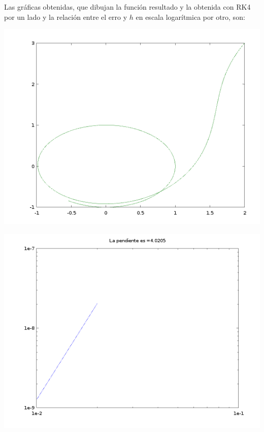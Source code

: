 Las gráficas obtenidas, que dibujan la función resultado y la obtenida con RK4 por un lado y la relación entre el erro y $h$ en escala logarítmica por otro, son:
\begin{center}
    \begin{minipage}{0.49\textwidth}
        \centering
        \includegraphics[width=\textwidth]{img/RK4_explicito_grafica.png}
    \end{minipage}
    \begin{minipage}{.49\textwidth}
        \centering
        \includegraphics[width=\textwidth]{img/RK4_explicito_pendiente.png}
    \end{minipage}
\end{center}

